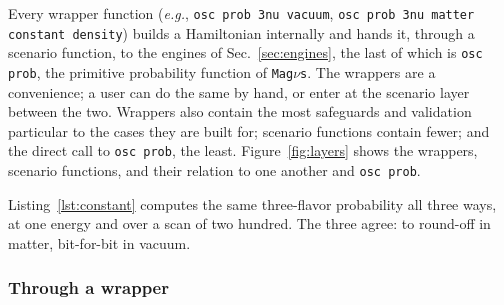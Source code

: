 \documentclass[final,5p,times,twocolumn,sort,compress]{elsarticle}
\makeatletter
\newcommand{\eg}{{\it e.g.}}
\DeclareRobustCommand{\_}{%
  \ifmmode\nfss@text{\textunderscore}\else\textunderscore\allowbreak\fi}
\newcommand{\magnus}{{\tt Mag}\ensuremath{\nu}{\tt s}}
\makeatother
\begin{document}
Every wrapper function (\eg, {\tt osc\_prob\_3nu\_vacuum}, {\tt osc\_prob\_3nu\_matter\_constant\_density}) builds a Hamiltonian internally and hands it, through a scenario function, to the engines of Sec.~\ref{sec:engines}, the last of which is {\tt osc\_prob}, the primitive probability function of \magnus. The wrappers are a convenience; a user can do the same by hand, or enter at the scenario layer between the two. Wrappers also contain the most safeguards and validation particular to the cases they are built for; scenario functions contain fewer; and the direct call to {\tt osc\_prob}, the least.  Figure~\ref{fig:layers} shows the wrappers, scenario functions, and their relation to one another and {\tt osc\_prob}.

Listing~\ref{lst:constant} computes the same three-flavor probability all three ways, at one energy and over a scan of two hundred. The three agree: to round-off in matter, bit-for-bit in vacuum. 


\subsubsection{Through a wrapper}
\label{sec:wrappers}
\end{document}

